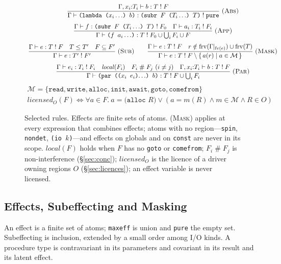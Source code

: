\documentclass[acmsmall,screen,review]{acmart}
\newcommand{\cd}[1]{\texttt{#1}}
\newcommand{\judge}[4]{#1 \vdash #2 : #3 \mathrel{!} #4}
\newcommand{\frv}{\mathrm{frv}}
\newcommand{\fv}{\mathrm{fv}}
\begin{document}
\begin{figure}[t]
\small
\[
\begin{array}{c}
\dfrac{\judge{\Gamma, x_i{:}T_i}{b}{T}{F}}
      {\judge{\Gamma}{\cd{(lambda ($x_i \ldots$) $b$)}}{\cd{(subr $F$ ($T_i \ldots$) $T$)}}{\cd{pure}}}
\;\textsc{(Abs)}
\\[14pt]
\dfrac{\judge{\Gamma}{f}{\cd{(subr $F$ ($T_i \ldots$) $T$)}}{F_0}\quad
       \judge{\Gamma}{a_i}{T_i}{F_i}}
      {\judge{\Gamma}{\cd{($f\ a_i \ldots$)}}{T}{F_0 \cup \bigcup_i F_i \cup F}}
\;\textsc{(App)}
\\[14pt]
\dfrac{\judge{\Gamma}{e}{T}{F}\quad T \le T'\quad F \subseteq F'}
      {\judge{\Gamma}{e}{T'}{F'}}
\;\textsc{(Sub)}
\qquad
\dfrac{\judge{\Gamma}{e}{T}{F}\quad
       r \notin \frv(\Gamma|_{\fv(e)}) \cup \frv(T)}
      {\judge{\Gamma}{e}{T}{F \setminus \{\,a(r) \mid a \in \mathcal{M}\,\}}}
\;\textsc{(Mask)}
\\[14pt]
\dfrac{\judge{\Gamma}{e_i}{T_i}{F_i}\quad
       \mathit{local}(F_i)\quad
       F_i \mathrel{\#} F_j\ (i \ne j)\quad
       \judge{\Gamma, x_i{:}T_i}{b}{T}{F}}
      {\judge{\Gamma}{\cd{(par (($x_i\ e_i$)$\ldots$) $b$)}}{T}{F \cup \bigcup_i F_i}}
\;\textsc{(Par)}
\end{array}
\]
\[
\begin{array}{l}
\mathcal{M} = \{\cd{read}, \cd{write}, \cd{alloc}, \cd{init}, \cd{await},
  \cd{goto}, \cd{comefrom}\}\\[3pt]
\mathit{licensed}_O(F) \iff \forall a \in F.\ a = \cd{(alloc $R$)} \lor
  (a = m(R) \land m \in \mathcal{M} \land R \in O)
\end{array}
\]
\caption{Selected rules. Effects are finite sets of atoms. \textsc{(Mask)}
applies at every expression that combines effects; atoms with no
region---\cd{spin}, \cd{nondet}, \cd{(io $k$)}---and effects on globals
and on \cd{const} are never in its scope. $\mathit{local}(F)$ holds when $F$ has no \cd{goto} or \cd{comefrom};
$F_i \mathrel{\#} F_j$ is non-interference (\S\ref{sec:conc}); $\mathit{licensed}_O$ is the licence
of a driver owning regions $O$ (\S\ref{sec:licences}); an effect variable
is never licensed.}
\label{fig:rules}
\end{figure}

\subsection{Effects, Subeffecting and Masking}

An effect is a finite set of atoms; \cd{maxeff} is union and \cd{pure}
the empty set. Subeffecting is inclusion, extended by a small order
among I/O kinds. A procedure type is contravariant in its parameters
and covariant in its result and its latent effect.
\end{document}
